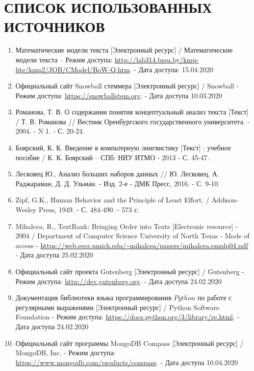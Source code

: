\chapter*{СПИСОК ИСПОЛЬЗОВАННЫХ ИСТОЧНИКОВ}

\begin{enumerate}
    \item \label{itm:mathmodel} Математические модели текста [Электронный ресурс] / Математические модели текста – Режим доступа: \url{http://lab314.brsu.by/kmp-lite/kmp2/JOB/CModel/BoW-Q.htm}. - Дата доступа: 15.04.2020

    \item \label{itm:snowball} Официальный сайт Snowball стеммера [Электронный ресурс] / Snowball - Режим доступа: \url{https://snowballstem.org}. - Дата доступа 10.03.2020

    \item \label{itm:romanova} Романова, Т. В. О содержании понятия концептуальный анализ текста [Текст] / Т. В. Романова // Вестник Оренбургского государственного университета. - 2004. - N 1. - С. 20-24.

    \item \label{itm:boyarsky} Боярский, К. К. Введение в компьтерную лингвистику [Текст] : учебное пособие / К. К. Боярский – СПб: НИУ ИТМО - 2013 - С. 45-47.

    \item \label{itm:datamining} Лесковец Ю., Анализ больших наборов данных // Ю. Лесковец, А. Раджараман, Д. Д. Ульман. - Изд. 2-е - ДМК Пресс, 2016. - С. 9-10.

    \item \label{itm:zipf} Zipf, G.K., Human Behavior and the Principle of Least Effort. / Addison-Wesley Press, 1949. - С. 484-490. - 573 с.

    \item \label{itm:textrank} Mihalcea, R., TextRank: Bringing Order into Texts [Electronic resource] - 2004 / Department of Computer Science University of North Texas - Mode of access - \url{https://web.eecs.umich.edu/~mihalcea/papers/mihalcea.emnlp04.pdf} - Дата доступа 25.02.2020

    \item \label{itm:gutenberg} Официальный сайт проекта Gutenberg [Электронный ресурс] / Gutenberg - Режим доступа: \url{http://dev.gutenberg.org}. - Дата доступа 24.02.2020

    \item \label{itm:regexp} Документация библиотеки языка программирования $Python$ по работе с регулярными выраженями [Электронный ресурс] / Python Software Foundation - Режим доступа: \url{https://docs.python.org/3/library/re.html}. - Дата доступа 24.02.2020

    \item \label{itm:compass} Официальный сайт программы MongoDB Compass [Электронный ресурс] / MongoDB, Inc. - Режим доступа: \url{https://www.mongodb.com/products/compass}. - Дата доступа 10.04.2020
\end{enumerate}

\newpage
